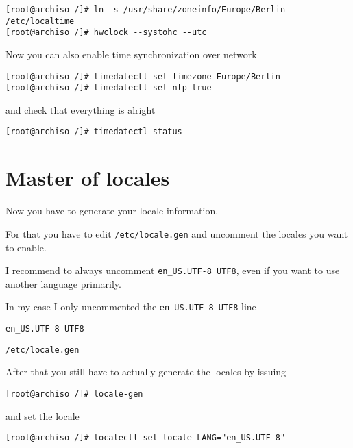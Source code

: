 \documentclass[10pt]{dustdoc}
\begin{document}
\begin{verbatim}
[root@archiso /]# ln -s /usr/share/zoneinfo/Europe/Berlin /etc/localtime
[root@archiso /]# hwclock --systohc --utc
\end{verbatim}

Now you can also enable time synchronization over network

\begin{verbatim}
[root@archiso /]# timedatectl set-timezone Europe/Berlin
[root@archiso /]# timedatectl set-ntp true
\end{verbatim}

\noindent
and check that everything is alright

\begin{verbatim}
[root@archiso /]# timedatectl status
\end{verbatim}

\section{Master of locales}
\label{sec:master-of-locales}

Now you have to generate your locale information.

For that you have to edit \texttt{/etc/locale.gen} and uncomment the locales you want to enable.

\begin{NOTE}
    I recommend to always uncomment \texttt{en_US.UTF-8 UTF8}, even if you want to use another language primarily.
\end{NOTE}

In my case I only uncommented the \texttt{en_US.UTF-8 UTF8} line

\begin{mintedlisting}
    \begin{verbatim}
en_US.UTF-8 UTF8
    \end{verbatim}

    \caption{\texttt{/etc/locale.gen}}
\end{mintedlisting}

After that you still have to actually generate the locales by issuing

\begin{verbatim}
[root@archiso /]# locale-gen
\end{verbatim}

\noindent
and set the locale

\begin{verbatim}
[root@archiso /]# localectl set-locale LANG="en_US.UTF-8"
\end{verbatim}
\end{document}
